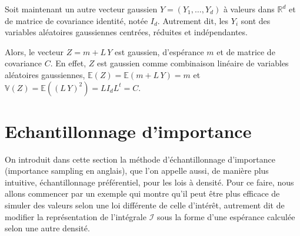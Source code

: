 Soit maintenant un autre vecteur gaussien \(Y = (Y_1,\ldots,Y_d)\) à
valeurs dans \(\mathbb{R}^d\) et de matrice de covariance identité,
notée \(I_d\). Autrement dit, les \(Y_i\) sont des variables aléatoires
gaussiennes centrées, réduites et indépendantes.

Alors, le vecteur \(Z = m + L\,Y\) est gaussien, d'espérance \(m\) et de
matrice de covariance \(C\). En effet, \(Z\) est gaussien comme
combinaison linéaire de variables aléatoires gaussiennes,
\(\mathbb{E}(Z) = \mathbb{E}(m + L\,Y) = m\) et
\(\mathbb{V}(Z) = \mathbb{E}((L\,Y)^2) = L I_d L^t = C\).

\chapter{Echantillonnage
d'importance}\label{V-echantillonnage-dimportance-1}

On introduit dans cette section la méthode d'échantillonnage
d'importance (importance sampling en anglais), que l'on appelle aussi,
de manière plus intuitive, échantillonnage préférentiel, pour les lois à
densité. Pour ce faire, nous allons commencer par un exemple qui montre
qu'il peut être plus efficace de simuler des valeurs selon une loi
différente de celle d'intérêt, autrement dit de modifier la
représentation de l'intégrale \(\mathcal{I}\) sous la forme d'une
espérance calculée selon une autre densité.

